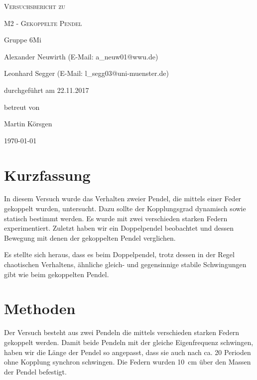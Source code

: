 \documentclass[
	a4paper,
	12pt,
	pagesize,
	ngerman
]{scrartcl}
\begin{document}
	
	\begin{titlepage}
		\centering
		{\scshape\LARGE Versuchsbericht zu \par}
		\vspace{1cm}
		{\scshape\huge M2 - Gekoppelte Pendel\par}
		\vspace{2.5cm}
		{\LARGE Gruppe 6Mi \par}
		\vspace{0.5cm}
		
		{\large Alexander Neuwirth (E-Mail: a\_neuw01@wwu.de) \par}
		{\large Leonhard Segger (E-Mail: l\_segg03@uni-muenster.de) \par}
		\vfill
		
		durchgeführt am 22.11.2017\par
		betreut von\par
		{\large Martin Körsgen}
		
		\vfill
		
		{\large \today\par}
	\end{titlepage}
	\tableofcontents
	\newpage
	
	\section{Kurzfassung}
	In diesem Versuch wurde das Verhalten zweier Pendel, die mittels einer Feder gekoppelt wurden, untersucht. Dazu sollte der Kopplungsgrad dynamisch sowie statisch bestimmt werden.
	Es wurde mit zwei verschieden starken Federn experimentiert.
	Zuletzt haben wir ein Doppelpendel beobachtet und dessen Bewegung mit denen der gekoppelten Pendel verglichen.

	Es stellte sich heraus, dass es beim Doppelpendel, trotz dessen in der Regel chaotischen Verhaltens, ähnliche gleich- und gegensinnige stabile Schwingungen gibt wie beim gekoppelten Pendel.

	\section{Methoden}
	Der Versuch besteht aus zwei Pendeln die mittels verschieden starken Federn gekoppelt werden. Damit beide Pendeln mit der gleiche Eigenfrequenz schwingen, haben wir die Länge der Pendel so angepasst, dass sie auch nach ca. 20 Perioden ohne Kopplung synchron schwingen. Die Federn wurden \SI{10}{cm} über den Massen der Pendel befestigt. 
	
\end{document}
